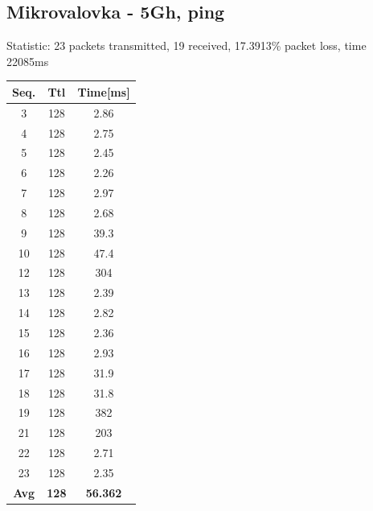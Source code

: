 \documentclass[11pt,a4paper,slovene]{article}
\begin{document}
\subsection{Mikrovalovka - 5Gh, ping}

Statistic: 23 packets transmitted, 19 received, 17.3913\% packet loss, time 22085ms
 
 
\begin{table}[H]
	\begin{adjustwidth}{-3cm}{-3cm}
	\centering
		\begin{tabular}{c|c|c}
		\hline
		\textbf{Seq.} & \textbf{Ttl} & \textbf{Time[ms]}\\
     	\hline
     	3 & 128 & 2.86\\
  		4 & 128 & 2.75\\
  		5 & 128 & 2.45\\
  		6 & 128 & 2.26\\
  		7 & 128 & 2.97\\
  		8 & 128 & 2.68\\
  		9 & 128 & 39.3\\
  		10 & 128 & 47.4\\
  		12 & 128 & 304\\
  		13 & 128 & 2.39\\
  		14 & 128 & 2.82\\
  		15 & 128 & 2.36\\
  		16 & 128 & 2.93\\
  		17 & 128 & 31.9\\
  		18 & 128 & 31.8\\
  		19 & 128 & 382\\
  		21 & 128 & 203\\
  		22 & 128 & 2.71\\
  		23 & 128 & 2.35\\
  		\hline
  		\textbf{Avg} & \textbf{128} & \textbf{56.362}\\
  		\hline
  		\end{tabular}
    	\end{adjustwidth}
\end{table}

\pagebreak


\end{document}
